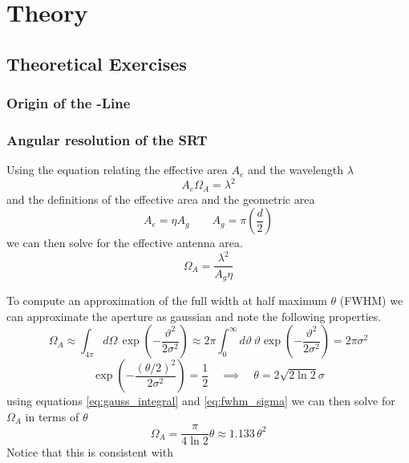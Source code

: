 \section{Theory}
\subsection{Theoretical Exercises}
\subsubsection[Origin of the HI-Line]{Origin of the -Line}

\subsubsection{Angular resolution of the SRT}\label{sec:ang_res}
Using the equation relating the effective area $A_e$ and the wavelength $\lambda$ \cite[p. 149]{wilson}
\begin{equation}
    A_e \Omega_A = \lambda^2
\end{equation}
and the definitions of the effective area and the geometric area \cite[p. 148]{wilson}
\begin{equation}
    A_e = \eta A_g \qquad A_g = \pi \left( \frac{d}{2} \right) \label{eq:A_e}
\end{equation}
we can then solve for the effective antenna area.
\begin{equation}
    \Omega_A = \frac{\lambda^2}{A_g \eta} \label{eq:Omega_A}
\end{equation}


To compute an approximation of the full width at half maximum $\theta$ (FWHM) we can approximate the aperture as gaussian \cite[p. 2]{srt} and note the following properties.
\begin{equation}
    \Omega_A \approx \int_{4\pi } d\Omega\, \exp{\left( -\frac{\vartheta^2}{2\sigma^2} \right)} \approx 2\pi \int_0^{\infty} d\vartheta \, \vartheta \exp{\left( -\frac{\vartheta^2}{2\sigma^2} \right)} = 2\pi \sigma^2
    \label{eq:gauss_integral}
\end{equation}
\begin{equation}
    \exp{\left( -\frac{(\theta/2)^2}{2\sigma^2}\right)} = \frac{1}{2} \quad \implies \quad \theta = 2 \sqrt{2\ln{2}} \sigma \label{eq:fwhm_sigma}
\end{equation}
using equations \eqref{eq:gauss_integral} and \eqref{eq:fwhm_sigma} we can then solve for $\Omega_A$ in terms of $\theta$
\begin{equation}
    \Omega_A = \frac{\pi}{4\ln{2}} \theta \approx 1.133 \, \theta^2 \label{eq:Omega_A_fwhhm}
\end{equation}
Notice that this is consistent with \cite[p.178 (8.13)]{wilson}

